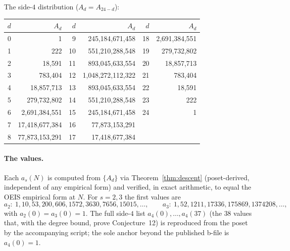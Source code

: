 \documentclass[11pt]{article}
\theoremstyle{plain}
\theoremstyle{definition}
\theoremstyle{remark}
\begin{document}
\noindent The side-$4$ distribution ($A_d=A_{24-d}$):
\begin{center}\small
\begin{tabular}{r r @{\hskip 2em} r r @{\hskip 2em} r r}
\toprule
$d$ & $A_d$ & $d$ & $A_d$ & $d$ & $A_d$\\
\midrule
0 & 1                 & 9  & 245{,}184{,}671{,}458   & 18 & 2{,}691{,}384{,}551\\
1 & 222               & 10 & 551{,}210{,}288{,}548   & 19 & 279{,}732{,}802\\
2 & 18{,}591          & 11 & 893{,}045{,}633{,}554   & 20 & 18{,}857{,}713\\
3 & 783{,}404         & 12 & 1{,}048{,}272{,}112{,}322 & 21 & 783{,}404\\
4 & 18{,}857{,}713    & 13 & 893{,}045{,}633{,}554   & 22 & 18{,}591\\
5 & 279{,}732{,}802   & 14 & 551{,}210{,}288{,}548   & 23 & 222\\
6 & 2{,}691{,}384{,}551 & 15 & 245{,}184{,}671{,}458 & 24 & 1\\
7 & 17{,}418{,}677{,}384 & 16 & 77{,}873{,}153{,}291 &    & \\
8 & 77{,}873{,}153{,}291 & 17 & 17{,}418{,}677{,}384 &    & \\
\bottomrule
\end{tabular}
\end{center}

\paragraph{The values.}
Each $a_s(N)$ is computed from $\{A_d\}$ via Theorem~\ref{thm:descent} (poset-derived, independent of
any empirical form) and verified, in exact arithmetic, to equal the OEIS empirical form at $N$. For
$s=2,3$ the first values are
\[
  a_2:\ 1,10,53,200,606,1572,3630,7656,15015,\dots,\qquad
  a_3:\ 1,52,1211,17336,175869,1374208,\dots,
\]
with $a_2(0)=a_3(0)=1$. The full side-$4$ list $a_4(0),\dots,a_4(37)$ (the $38$ values that, with the
degree bound, prove Conjecture~12) is reproduced from the poset by the accompanying script; the
sole anchor beyond the published b-file is $a_4(0)=1$.
\end{document}
